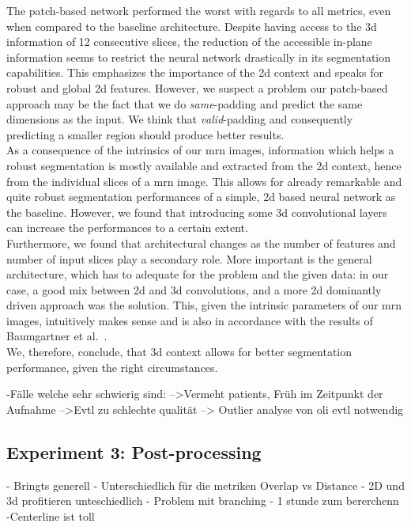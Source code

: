 The patch-based network performed the worst with regards to all metrics, even when compared to the baseline architecture. Despite having access to the \gls{3d} information of 12 consecutive slices, the reduction of the accessible in-plane information seems to restrict the neural network drastically in its segmentation capabilities. This emphasizes the importance of the \gls{2d} context and speaks for robust and global \gls{2d} features. However, we suspect a problem our patch-based approach may be the fact that we do \textit{same}-padding and predict the same dimensions as the input. We think that \textit{valid}-padding and consequently predicting a smaller region should produce better results.\\
As a consequence of the intrinsics of our \gls{mrn} images, information which helps a robust segmentation is mostly available and extracted from the \gls{2d} context, hence from the individual slices of a \gls{mrn} image. This allows for already remarkable and quite robust segmentation performances of a simple, \gls{2d} based neural network as the baseline. However, we found that introducing some \gls{3d} convolutional layers can increase the performances to a certain extent. \\
Furthermore, we found that architectural changes as the number of features and number of input slices play a secondary role. More important is the general architecture, which has to adequate for the problem and the given data: in our case, a good mix between \gls{2d} and \gls{3d} convolutions, and a more \gls{2d} dominantly driven approach was the solution. This, given the intrinsic parameters of our \gls{mrn} images, intuitively makes sense and is also in accordance with the results of Baumgartner et al.~\cite{Baumgartner2017AnSegmentation}.\\
We, therefore, conclude, that \gls{3d} context allows for better segmentation performance, given the right circumstances.


-Fälle welche sehr schwierig sind:
-->Vermeht patients, Früh im Zeitpunkt der Aufnahme
-->Evtl zu schlechte qualität --> Outlier analyse von oli evtl notwendig




\subsection{Experiment 3: Post-processing}
- Bringts generell
- Unterschiedlich für die metriken Overlap vs Distance
- 2D und 3d profitieren unteschiedlich
- Problem mit branching
- 1 stunde zum bererchenn
-Centerline ist toll


